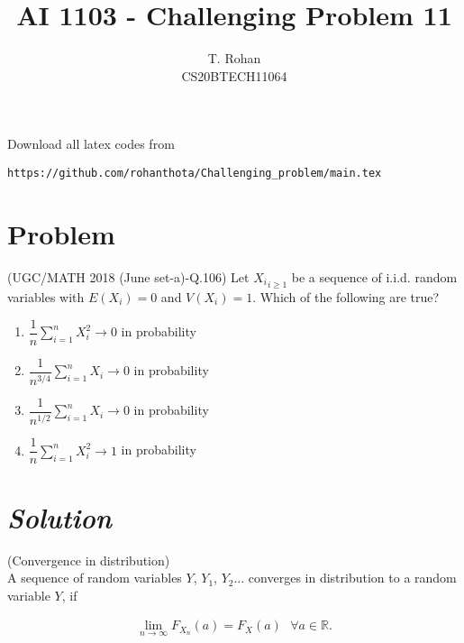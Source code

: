 \documentclass[journal,12pt,twocolumn]{IEEEtran}
\begin{document}
\def\putbox#1#2#3{\makebox[0in][l]{\makebox[#1][l]{}\raisebox{\baselineskip}[0in][0in]{\raisebox{#2}[0in][0in]{#3}}}}
     \def\rightbox#1{\makebox[0in][r]{#1}}
     \def\centbox#1{\makebox[0in]{#1}}
     \def\topbox#1{\raisebox{-\baselineskip}[0in][0in]{#1}}
     \def\midbox#1{\raisebox{-0.5\baselineskip}[0in][0in]{#1}}
\vspace{3cm}
\title{AI 1103 - Challenging Problem 11}
\author{T. Rohan \\ CS20BTECH11064}
\maketitle
\newpage
\bigskip
\renewcommand{\thefigure}{\theenumi}
\renewcommand{\thetable}{\theenumi}
Download all latex codes from 
\begin{lstlisting}
https://github.com/rohanthota/Challenging_problem/main.tex
\end{lstlisting}
\section{Problem}
(UGC/MATH 2018 (June set-a)-Q.106) Let ${X_i}_{i \geq 1}$ be a sequence of i.i.d. random variables with $E(X_i)=0$ and $V(X_i)=1$. Which of the following are true?
\vspace{0.2cm}
\begin{enumerate}
    \item $\dfrac{1}{n} \sum_{i=1}^n X_i^2 \to 0$ in probability 
    \item $\dfrac{1}{n^{3/4}} \sum_{i=1}^n X_i \to 0$ in probability 
    \item $\dfrac{1}{n^{1/2}} \sum_{i=1}^n X_i \to 0$ in probability 
    \item $\dfrac{1}{n} \sum_{i=1}^n X_i^2 \to 1$ in probability
\end{enumerate}

\section{\emph{Solution}}
\begin{definition}
    (Convergence in distribution)\\
    A sequence of random variables $Y$, $Y_1$, $Y_2 \ldots$   converges in distribution to a random variable $Y$, if

    \begin{align}
        \lim_{n \to \infty}F_{X_{n}} (a) = F_{X} (a)  \text{  }\forall a \in \mathbb{R}.
    \end{align}
\end{definition}
\end{document}

